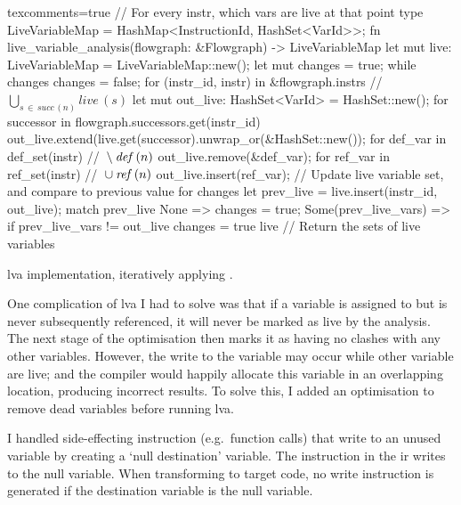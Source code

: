 \documentclass[00-main.tex]{subfiles}
\begin{document}
\begin{listing}[!t]
  \begin{RustListing*}{texcomments=true}
    // For every instr, which vars are live at that point
    type LiveVariableMap = HashMap<InstructionId, HashSet<VarId>>;
    fn live_variable_analysis(flowgraph: &Flowgraph) -> LiveVariableMap {
        let mut live: LiveVariableMap = LiveVariableMap::new();
        let mut changes = true;
        while changes {
            changes = false;
            for (instr_id, instr) in &flowgraph.instrs {
                // $\bigcup_{s \,\in\, \mathit{succ}\,(n)} \mathit{live}\,(s)$
                let mut out_live: HashSet<VarId> = HashSet::new();
                for successor in flowgraph.successors.get(instr_id) {
                    out_live.extend(live.get(successor).unwrap_or(&HashSet::new());
                }
                for def_var in def_set(instr) { // ${} \setminus \lvadef\,(n)$
                    out_live.remove(&def_var);
                }
                for ref_var in ref_set(instr) { // ${} \cup \lvaref\,(n)$
                    out_live.insert(ref_var);
                }
                // Update live variable set, and compare to previous value for changes
                let prev_live = live.insert(instr_id, out_live);
                match prev_live {
                    None => {
                        changes = true;
                    }
                    Some(prev_live_vars) => {
                        if prev_live_vars != out_live {
                            changes = true
                        }
                    }
                }
            }
        }
        live // Return the sets of live variables
    }
  \end{RustListing*}
  \caption{\Acrlong{lva} implementation, iteratively applying .}%
  \label{lst:lva implementation}
\end{listing}

One complication of \gls{lva} I had to solve was that if a variable is assigned to but is never subsequently referenced, it will never be marked as live by the analysis.
The next stage of the optimisation then marks it as having no clashes with any other variables.
However, the write to the variable may occur while other variable are live; and the compiler would happily allocate this variable in an overlapping location, producing incorrect results.
To solve this, I added an optimisation to remove dead variables before running \gls{lva}.

I handled side-effecting instruction (e.g.~function calls) that write to an unused variable by creating a `null destination' variable.
The instruction in the \gls{ir} writes to the null variable.
When transforming to target code, no write instruction is generated if the destination variable is the null variable.
\end{document}
